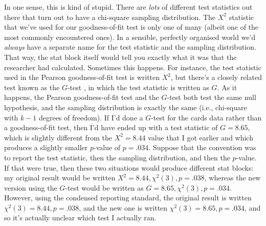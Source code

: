 In one sense, this is kind of stupid. There are {\it lots} of different test statistics out there that turn out to have a chi-square sampling distribution. The $X^2$ statistic that we've used for our goodness-of-fit test is only one of many (albeit one of the most commonly encountered ones). In a sensible, perfectly organised world we'd {\it always} have a separate name for the test statistic and the sampling distribution. That way, the stat block itself would tell you exactly what it was that the researcher had calculated. Sometimes this happens. For instance, the test statistic used in the Pearson goodness-of-fit test is written $X^2$, but there's a closely related test known as the $G$-test \parencite{Sokal1994}, in which the test statistic is written as $G$. As it happens, the Pearson goodness-of-fit test and the $G$-test both test the same null hypothesis, and the sampling distribution is exactly the same (i.e., chi-square with $k-1$ degrees of freedom). If I'd done a $G$-test for the cards data rather than a goodness-of-fit test, then I'd have ended up with a test statistic of $G = 8.65$, which is slightly different from the $X^2 = 8.44$ value that I got earlier and which produces a slightly smaller $p$-value of $p = .034$. Suppose that the convention was to report the test statistic, then the sampling distribution, and then the $p$-value. If that were true, then these two situations would produce different stat blocks: my original result would be written $X^2 = 8.44, \chi^2(3), p = .038$, whereas the new version using the $G$-test would be written as $G = 8.65, \chi^2(3), p = .034$. However, using the condensed reporting standard, the original result is written $\chi^2(3) = 8.44, p = .038$, and the new one is written $\chi^2(3) = 8.65, p = .034$, and so it's actually unclear which test I actually ran.  

